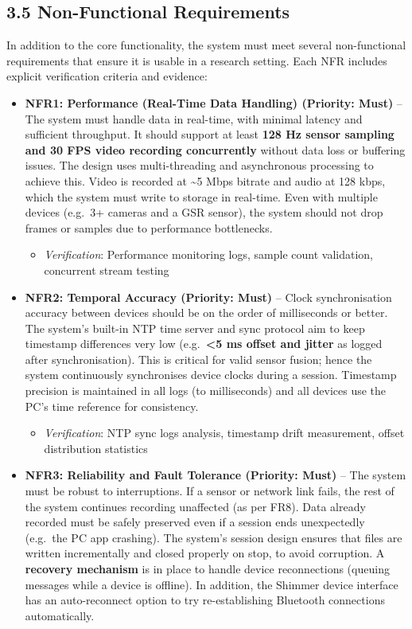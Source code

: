 \documentclass[12pt,a4paper]{article}
\begin{document}
\subsection{3.5 Non-Functional Requirements}\label{non-functional-requirements}

In addition to the core functionality, the system must meet several non-functional requirements that ensure it is usable in a research setting. Each NFR includes explicit verification criteria and evidence:

\begin{itemize}
\tightlist
\item
  \textbf{NFR1: Performance (Real-Time Data Handling) (Priority: Must)} -- The system must handle data in real-time, with minimal latency and sufficient throughput. It should support at least \textbf{128 Hz sensor sampling and 30 FPS video recording concurrently} without data loss or buffering issues. The design uses multi-threading and asynchronous processing to achieve this. Video is recorded at \textasciitilde5 Mbps bitrate and audio at 128 kbps, which the system must write to storage in real-time. Even with multiple devices (e.g.~3+ cameras and a GSR sensor), the system should not drop frames or samples due to performance bottlenecks.

  \begin{itemize}
  \tightlist
  \item
    \emph{Verification}: Performance monitoring logs, sample count validation, concurrent stream testing
  \end{itemize}
\item
  \textbf{NFR2: Temporal Accuracy (Priority: Must)} -- Clock synchronisation accuracy between devices should be on the order of milliseconds or better. The system's built-in NTP time server and sync protocol aim to keep timestamp differences very low (e.g.~\textbf{\textless5 ms offset and jitter} as logged after synchronisation). This is critical for valid sensor fusion; hence the system continuously synchronises device clocks during a session. Timestamp precision is maintained in all logs (to milliseconds) and all devices use the PC's time reference for consistency.

  \begin{itemize}
  \tightlist
  \item
    \emph{Verification}: NTP sync logs analysis, timestamp drift measurement, offset distribution statistics
  \end{itemize}
\item
  \textbf{NFR3: Reliability and Fault Tolerance (Priority: Must)} -- The system must be robust to interruptions. If a sensor or network link fails, the rest of the system continues recording unaffected (as per FR8). Data already recorded must be safely preserved even if a session ends unexpectedly (e.g.~the PC app crashing). The system's session design ensures that files are written incrementally and closed properly on stop, to avoid corruption. A \textbf{recovery mechanism} is in place to handle device reconnections (queuing messages while a device is offline). In addition, the Shimmer device interface has an auto-reconnect option to try re-establishing Bluetooth connections automatically.


\end{itemize}
\end{document}

